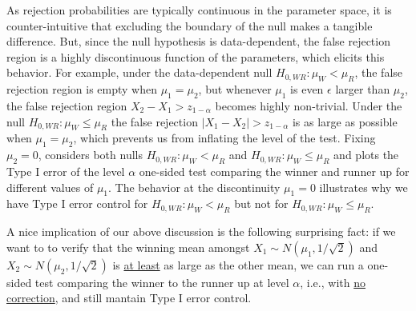 \documentclass{article}
\begin{document}
As rejection probabilities are typically continuous in the parameter space, it is counter-intuitive that excluding the boundary of the null makes a tangible difference. But, since the null hypothesis is data-dependent, the false rejection region is a highly discontinuous function of the parameters, which elicits this behavior. For example, under the data-dependent null $H_{0, WR} :\mu_W < \mu_R$, the false rejection region is empty when $\mu_1 = \mu_2$, but whenever $\mu_1$ is even $\epsilon$ larger than $\mu_2$,  the false rejection region $X_2 - X_1 > z_{1-\alpha}$ becomes highly non-trivial. Under the null $H_{0, WR} :\mu_W \leq \mu_R$ the false rejection $|X_1 - X_2| > z_{1-\alpha}$ is as large as possible when $\mu_1 = \mu_2$, which prevents us from inflating the level of the test. Fixing $\mu_2 = 0$,  considers both nulls $H_{0, WR} :\mu_W < \mu_R$ and $H_{0, WR} :\mu_W \leq \mu_R$ and plots the Type I error of the level $\alpha$ one-sided test comparing the winner and runner up for different values of $\mu_1$. The behavior at the discontinuity $\mu_1=0$ illustrates why we have Type I error control for $H_{0, WR} :\mu_W < \mu_R$  but not for $H_{0, WR} :\mu_W \leq \mu_R$. 

A nice implication of our above discussion is the following surprising fact: if we want to to verify that the winning mean amongst $X_1 \sim N(\mu_1, 1/\sqrt{2})$ and $X_2 \sim N(\mu_2, 1/\sqrt{2})$ is \underline{at least} as large as the other mean, we can run a one-sided test comparing the winner to the runner up at level $\alpha$, i.e., with \underline{no correction}, and still mantain Type I error control. 
\end{document}
